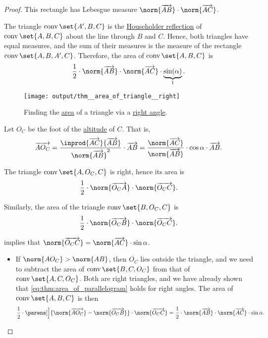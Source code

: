 \begin{proof}
  This rectangle has Lebesgue measure \( \norm{\vect{AB}} \cdot \norm{\vect{AC}} \).

  The triangle \( \conv\set{ A', B, C } \) is the \hyperref[def:rigid_motion/householder_reflection]{Householder reflection} of \( \conv\set{ A, B, C } \) about the line through \( B \) and \( C \). Hence, both triangles have equal measures, and the sum of their measures is the measure of the rectangle \( \conv\set{ A, B, A', C } \). Therefore, the area of \( \conv\set{ A, B, C } \) is
  \begin{equation*}
    \frac 1 2 \cdot \norm{\vect{AB}} \cdot \norm{\vect{AC}} \cdot \underbrace{ \sin(\alpha) }_{1}.
  \end{equation*}

  \begin{figure}[!ht]
    \centering
    \texttt{[image: output/thm\_\_area\_of\_triangle\_\_right]}
    \caption{Finding the \hyperref[def:figure_area]{area} of a triangle via a \hyperref[def:angle/measure/right]{right angle}.}\label{fig:thm:area_of_triangle/right}
  \end{figure}

   Let \( O_C \) be the foot of the \hyperref[def:triangle_altitude]{altitude} of \( C \). That is,
  \begin{equation*}
    \vect{A O_C}
    =
    \frac {\inprod {\vect{AC}} {\vect{AB}}} {\norm{\vect{AB}}^2} \cdot \vect{AB}
    =
    \frac {\norm{\vect{AC}}} {\norm{\vect{AB}}} \cdot \cos \alpha \cdot \vect{AB}.
  \end{equation*}

  The triangle \( \conv\set{ A, O_C, C } \) is right, hence its area is
  \begin{equation*}
    \frac 1 2 \cdot \norm{\vect{ O_CA}} \cdot \norm{\vect{O_C C}}.
  \end{equation*}

  Similarly, the area of the triangle \( \conv\set{ B, O_C, C } \) is
  \begin{equation*}
    \frac 1 2 \cdot \norm{\vect{O_C B}} \cdot \norm{\vect{O_C C}}.
  \end{equation*}

   implies that \( \norm{\vect{O_C C}} = \norm{\vect{AC}} \cdot \sin \alpha \).

  \begin{itemize}
    \item If \( \norm{A O_C} > \norm{A B} \), then \( O_C \) lies outside the triangle, and we need to subtract the area of \( \conv\set{ B, C, O_C } \) from that of \( \conv\set{ A, C, O_C } \). Both are right triangles, and we have already shown that \eqref{eq:thm:area_of_parallelogram} holds for right angles. The area of \( \conv\set{ A, B, C } \) is then
    \begin{equation*}
      \frac 1 2 \cdot \parens[\Big]{ \norm{\vect{A O_C}} - \norm{\vect{O_C B}} } \cdot \norm{\vect{O_C C}} = \frac 1 2 \cdot \norm{\vect{AB}} \cdot \norm{\vect{AC}} \cdot \sin \alpha.
    \end{equation*}


\end{itemize}
\end{proof}
